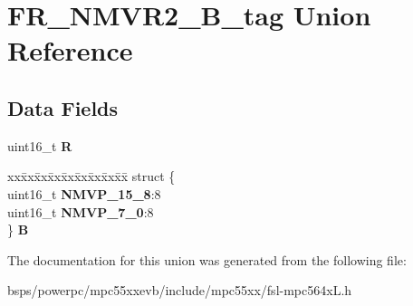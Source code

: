 \hypertarget{unionFR__NMVR2__16B__tag}{}\section{F\+R\+\_\+\+N\+M\+V\+R2\+\_\+B\+\_\+tag Union Reference}
\label{unionFR__NMVR2__16B__tag}
\subsection*{Data Fields}
\begin{DoxyCompactItemize}
\item 
\mbox{\label{unionFR__NMVR2__16B__tag_a70ae86cea7f4b0d433868122798721cd}} 
uint16\+\_\+t {\bfseries R}
\item 
\mbox{\label{unionFR__NMVR2__16B__tag_a3c1460eabb8b25e81613f4caf1d74b99}} 
\begin{tabbing}
xx\=xx\=xx\=xx\=xx\=xx\=xx\=xx\=xx\=\kill
struct \{\\
\>uint16\_t {\bfseries NMVP\_15\_8}:8\\
\>uint16\_t {\bfseries NMVP\_7\_0}:8\\
\} {\bfseries B}\\

\end{tabbing}\end{DoxyCompactItemize}


The documentation for this union was generated from the following file\+:\begin{DoxyCompactItemize}
\item 
bsps/powerpc/mpc55xxevb/include/mpc55xx/fsl-\/mpc564x\+L.\+h\end{DoxyCompactItemize}
